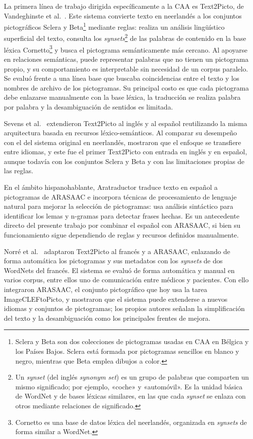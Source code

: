 La primera línea de trabajo dirigida específicamente a la CAA es Text2Picto, de Vandeghinste et al.\ \cite{vandeghinste2017}. Este sistema convierte texto en neerlandés a los conjuntos pictográficos Sclera y Beta\footnote{Sclera y Beta son dos colecciones de pictogramas usadas en CAA en Bélgica y los Países Bajos. Sclera está formada por pictogramas sencillos en blanco y negro, mientras que Beta emplea dibujos a color.} mediante reglas: realiza un análisis lingüístico superficial del texto, consulta los \textit{synsets}\footnote{Un \textit{synset} (del inglés \textit{synonym set}) es un grupo de palabras que comparten un mismo significado; por ejemplo, «coche» y «automóvil». Es la unidad básica de WordNet y de bases léxicas similares, en las que cada \textit{synset} se enlaza con otros mediante relaciones de significado.} de las palabras de contenido en la base léxica Cornetto\footnote{Cornetto es una base de datos léxica del neerlandés, organizada en \textit{synsets} de forma similar a WordNet.} y busca el pictograma semánticamente más cercano. Al apoyarse en relaciones semánticas, puede representar palabras que no tienen un pictograma propio, y su comportamiento es interpretable sin necesidad de un corpus paralelo. Se evaluó frente a una línea base que buscaba coincidencias entre el texto y los nombres de archivo de los pictogramas. Su principal costo es que cada pictograma debe enlazarse manualmente con la base léxica, la traducción se realiza palabra por palabra y la desambiguación de sentidos es limitada.

Sevens et al.\ \cite{sevens2015} extendieron Text2Picto al inglés y al español reutilizando la misma arquitectura basada en recursos léxico-semánticos. Al comparar su desempeño con el del sistema original en neerlandés, mostraron que el enfoque se transfiere entre idiomas, y este fue el primer Text2Picto con entrada en inglés y en español, aunque todavía con los conjuntos Sclera y Beta y con las limitaciones propias de las reglas.

En el ámbito hispanohablante, Aratraductor \cite{bautista2017} traduce texto en español a pictogramas de ARASAAC e incorpora técnicas de procesamiento de lenguaje natural para mejorar la selección de pictogramas: usa análisis sintáctico para identificar los lemas y n-gramas para detectar frases hechas. Es un antecedente directo del presente trabajo por combinar el español con ARASAAC, si bien su funcionamiento sigue dependiendo de reglas y recursos definidos manualmente.

Norré et al.\ \cite{norre2021} adaptaron Text2Picto al francés y a ARASAAC, enlazando de forma automática los pictogramas y sus metadatos con los \textit{synsets} de dos WordNets del francés. El sistema se evaluó de forma automática y manual en varios corpus, entre ellos uno de comunicación entre médicos y pacientes. Con ello integraron ARASAAC, el conjunto pictográfico que hoy usa la tarea ImageCLEFtoPicto, y mostraron que el sistema puede extenderse a nuevos idiomas y conjuntos de pictogramas; los propios autores señalan la simplificación del texto y la desambiguación como los principales frentes de mejora.

